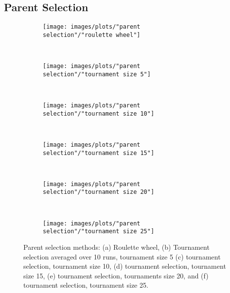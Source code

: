 \documentclass[12pt]{report}
\begin{document}
\subsection{Parent Selection}


\begin{figure}[h!]
    \centering
    \begin{subfigure}[b]{0.31\textwidth}
        \texttt{[image: images/plots/"parent selection"/"roulette wheel"]}
        \caption{}
        \hfill
        \label{plot:roulette wheel}
    \end{subfigure}
    ~
    \begin{subfigure}[b]{0.31\textwidth}
        \texttt{[image: images/plots/"parent selection"/"tournament size 5"]}
        \caption{}
        \hfill
        \label{plot:tournament size 5}
    \end{subfigure}
    ~
       \begin{subfigure}[b]{0.31\textwidth}
        \texttt{[image: images/plots/"parent selection"/"tournament size 10"]}
        \caption{}
        \hfill
        \label{plot:tournament size 10}
    \end{subfigure}
    ~
       \begin{subfigure}[b]{0.31\textwidth}
        \texttt{[image: images/plots/"parent selection"/"tournament size 15"]}
        \caption{}
        \hfill
        \label{plot:tournament size 15}
    \end{subfigure}
    ~
       \begin{subfigure}[b]{0.31\textwidth}
        \texttt{[image: images/plots/"parent selection"/"tournament size 20"]}
        \caption{}
        \hfill
        \label{plot:tournament size 20}
    \end{subfigure}
    ~
    \begin{subfigure}[b]{0.31\textwidth}
        \texttt{[image: images/plots/"parent selection"/"tournament size 25"]}
        \caption{}
        \hfill
        \label{plot:tournament size 25}
    \end{subfigure}
    \caption{Parent selection methods: (a) Roulette wheel, (b) Tournament selection averaged over 10 runs, tournament size 5 (c) tournament selection, tournament size 10, (d) tournament selection, tournament size 15, (e) tournament selection, tournaments size 20, and (f) tournament selection, tournament size 25.}
    \label{plot:parent selection}
\end{figure}
\end{document}

